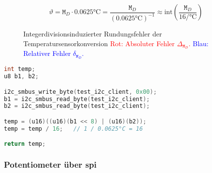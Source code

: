 \begin{equation}
    \vartheta = \texttt{M}_D \cdot 0.0625\si{\celsius} = \frac{\texttt{M}_D}{\left(0.0625\si{\celsius}\right)^{-1}} \approx \text{int}\left(\frac{\texttt{M}_D}{16\si{\per\celsius}}\right)
    \label{eq:temp-convert}
\end{equation}
\begin{figure}
    \centering
    \caption[Integerdivisionsinduzierter Rundungsfehler]{Integerdivisionsinduzierter Rundungsfehler der Temperatursensorkonversion
    \textcolor{red}{Rot: Absoluter Fehler $\Delta_{\texttt{M}_D}$.}
    \textcolor{blue}{Blau: Relativer Fehler $\delta_{\texttt{M}_D}$.}
    }
    \label{fig:rounding-err}
\end{figure}
\begin{lstlisting}[language=C, firstnumber=39]
int temp;
u8 b1, b2;

i2c_smbus_write_byte(test_i2c_client, 0x00);
b1 = i2c_smbus_read_byte(test_i2c_client);
b2 = i2c_smbus_read_byte(test_i2c_client);

temp = (u16)((u16)(b1 << 8) | (u16)(b2));
temp = temp / 16;	// 1 / 0.0625°C = 16

return temp;
\end{lstlisting}

\subsubsection{Potentiometer über \acrshort{spi}}

